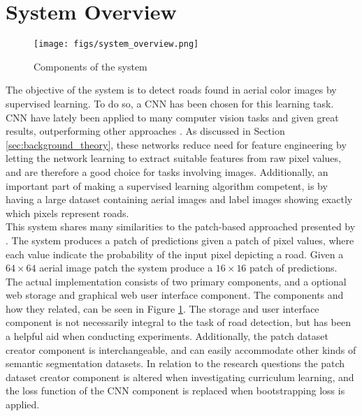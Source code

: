 \section{System Overview}
\label{sec:systemOverview}
\begin{figure}[t]
\begin{center}
\texttt{[image: figs/system\_overview.png]}
\caption[Components of the system]{Components of the system}
\label{fig:system_components}
\end{center}
\end{figure}

The objective of the system is to detect roads found in aerial color images by supervised learning. To do so, a \ac{CNN} has been chosen for this learning task. \ac{CNN} have lately been applied to many computer vision tasks and given great results, outperforming other approaches \citep{Krizhevsky_imagenet} . As discussed in Section \ref{sec:background_theory}, these networks reduce need for feature engineering by letting the network learning to extract suitable features from raw pixel values, and are therefore a good choice for tasks involving images. Additionally, an important part of making a supervised learning algorithm competent, is by having a large dataset containing aerial images and label images showing exactly which pixels represent roads.\\

This system shares many similarities to the patch-based approached presented by \cite{Mnih_aerial_images_noisy}. The system produces a patch of predictions given a patch of pixel values, where each value indicate the probability of the input pixel depicting a road. Given a $64 \times 64$ aerial image patch the system produce a $16 \times 16$ patch of predictions.\\


The actual implementation consists of two primary components, and a optional web storage and graphical web user interface component. The components and how they related, can be seen in Figure \ref{fig:system_components}. The storage and user interface component is not necessarily  integral to the task of road detection, but has been a helpful aid when conducting experiments. Additionally, the patch dataset creator component is interchangeable, and can easily accommodate other kinds of semantic segmentation datasets. In relation to the research questions the patch dataset creator component is altered when investigating curriculum learning, and the loss function of the \ac{CNN}  component is replaced when bootstrapping loss is applied. \\


